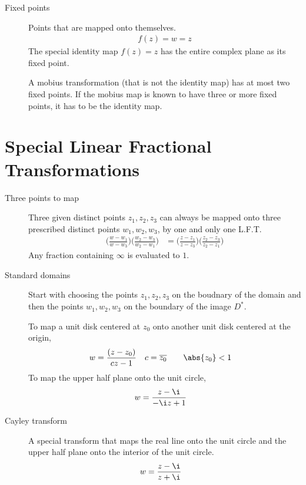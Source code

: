 \begin{description}
    \item[Fixed points] Points that are mapped onto themselves.
        \begin{align}
            f(z) = w = z
        \end{align}
        The special identity map $ f(z) = z $ has the entire complex plane as its
        fixed point. \par
        A mobius transformation (that is not the identity map) has at most two fixed
        points. If the mobius map is known to have three or more fixed points, it has to
        be the identity map.
\end{description}

\section{Special Linear Fractional Transformations}

\begin{description}
    \item[Three points to map] Three given distinct points $ z_1,z_2,z_3 $
        can always be mapped onto three prescribed distinct points $ w_1,w_2,w_3 $,
        by one and only one L.F.T.
        \begin{align}
            \Bigg( \frac{w - w_1}{w - w_3} \Bigg) \Bigg( \frac{w_2 - w_3}
            {w_2 - w_1} \Bigg) & = \Bigg( \frac{z - z_1}{z - z_3} \Bigg)
            \Bigg( \frac{z_2 - z_3}{z_2 - z_1} \Bigg)
        \end{align}
        Any fraction containing $ \infty $ is evaluated to $ 1 $.

    \item[Standard domains] Start with choosing the points $ z_1,z_2,z_3 $ on the
        boudnary of the domain and then the points $ w_1, w_2, w_3 $ on the boundary of
        the image $ D^* $. \par
        To map a unit disk centered at $ z_0 $ onto another unit disk centered at the
        origin,
        \begin{align}
            w & = \frac{(z - z_0)}{cz - 1} & c & = \overline{z_0} \qquad \abs{z_0} < 1
        \end{align}
        To map the upper half plane onto the unit circle,
        \begin{align}
            w & = \frac{z - \i}{-\i z + 1}
        \end{align}

    \item[Cayley transform] A special transform that maps the real line onto the
        unit circle and the upper half plane onto the interior of the unit circle.
        \begin{align}
            w & = \frac{z - \i}{z + \i}
        \end{align}
\end{description}

